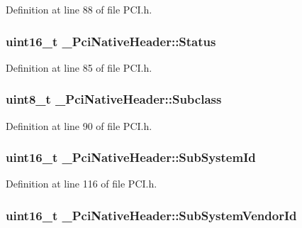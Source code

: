 Definition at line 88 of file P\+C\+I.\+h.

\subsubsection[{\texorpdfstring{Status}{Status}}]{\setlength{\rightskip}{0pt plus 5cm}uint16\+\_\+t \+\_\+\+Pci\+Native\+Header\+::\+Status}\hypertarget{struct__PciNativeHeader_a8e4bcdfb2744454f91bae6ee68ce0a44}{}\label{struct__PciNativeHeader_a8e4bcdfb2744454f91bae6ee68ce0a44}


Definition at line 85 of file P\+C\+I.\+h.

\subsubsection[{\texorpdfstring{Subclass}{Subclass}}]{\setlength{\rightskip}{0pt plus 5cm}uint8\+\_\+t \+\_\+\+Pci\+Native\+Header\+::\+Subclass}\hypertarget{struct__PciNativeHeader_a988d996c402af2ac9a89b86d409815b5}{}\label{struct__PciNativeHeader_a988d996c402af2ac9a89b86d409815b5}


Definition at line 90 of file P\+C\+I.\+h.

\subsubsection[{\texorpdfstring{Sub\+System\+Id}{SubSystemId}}]{\setlength{\rightskip}{0pt plus 5cm}uint16\+\_\+t \+\_\+\+Pci\+Native\+Header\+::\+Sub\+System\+Id}\hypertarget{struct__PciNativeHeader_a890fa8d2edfa526899a3c547f0fff6ee}{}\label{struct__PciNativeHeader_a890fa8d2edfa526899a3c547f0fff6ee}


Definition at line 116 of file P\+C\+I.\+h.

\subsubsection[{\texorpdfstring{Sub\+System\+Vendor\+Id}{SubSystemVendorId}}]{\setlength{\rightskip}{0pt plus 5cm}uint16\+\_\+t \+\_\+\+Pci\+Native\+Header\+::\+Sub\+System\+Vendor\+Id}\hypertarget{struct__PciNativeHeader_aded2bf4a3ea0efc410cf091ae736ae7e}{}\label{struct__PciNativeHeader_aded2bf4a3ea0efc410cf091ae736ae7e}



